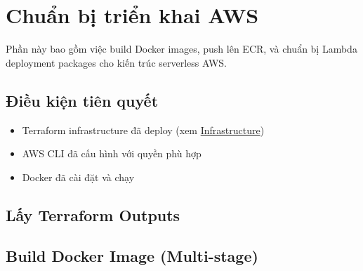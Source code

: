 \hypertarget{chuux1ea9n-bux1ecb-triux1ec3n-khai-aws}{%
\section{Chuẩn bị triển khai
AWS}}

Phần này bao gồm việc build Docker images, push lên ECR, và chuẩn bị
Lambda deployment packages cho kiến trúc serverless AWS.

\hypertarget{ux111iux1ec1u-kiux1ec7n-tiuxean-quyux1ebft}{%
\subsection{Điều kiện tiên
quyết}}

\begin{itemize}
\tightlist
\item
  Terraform infrastructure đã deploy (xem
  \href{5.3-Infrastructure/}{Infrastructure})
\item
  AWS CLI đã cấu hình với quyền phù hợp
\item
  Docker đã cài đặt và chạy
\end{itemize}

\hypertarget{lux1ea5y-terraform-outputs}{%
\subsection{Lấy Terraform Outputs}}

\begin{Shaded}
\begin{Highlighting}[]
\OperatorTok{=}\VariableTok{$(}\VariableTok{)}
\OperatorTok{=}\VariableTok{$(}\VariableTok{)}
\OperatorTok{=}\VariableTok{$(}\VariableTok{)}

 
 
 
\end{Highlighting}
\end{Shaded}

\hypertarget{build-docker-image-multi-stage}{%
\subsection{Build Docker Image
(Multi-stage)}}

